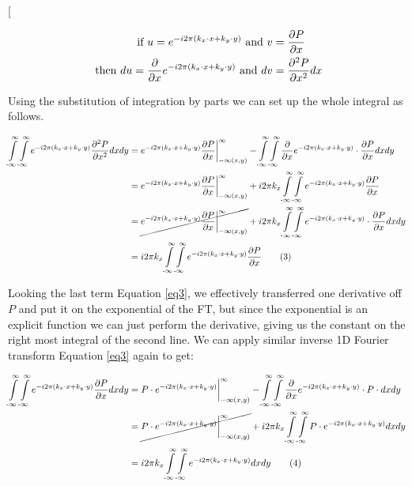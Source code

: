 \twocolumn[\begin{@twocolumnfalse}
\begin{align*} 
\textnormal{ if } u = e^{-i 2\pi (k_x \cdot x + k_y \cdot y )} \textnormal{ and } v &= \frac{\partial P}{\partial x} \\
\textnormal{ then } du= \frac{\partial}{\partial x} e^{-i 2\pi (k_x \cdot x + k_y \cdot y )} \textnormal{ and } dv &=  \frac{\partial^2 P}{\partial x^2} dx
\label{ibp2}  
\end{align*}  

Using the substitution of integration by parts we can set up the whole integral as follows.

\begin{align}  
\int\limits^{\infty}_{\text{-}\infty}\int\limits^{\infty}_{\text{-}\infty} e^{-i 2\pi (k_x \cdot x + k_y \cdot y )} \frac{\partial^2 P}{\partial x^2} dx dy &= e^{-i 2\pi (k_x \cdot x + k_y \cdot y )} \frac{\partial P}{\partial x} \bigg \vert^{\infty}_{-\infty(x,y)} - \int\limits^{\infty}_{\text{-}\infty}\int\limits^{\infty}_{\text{-}\infty} \frac{\partial }{\partial x} e^{-i 2\pi (k_x \cdot x + k_y \cdot y )} \cdot \frac{\partial P}{\partial x} dx dy\\
& = e^{-i 2\pi (k_x \cdot x + k_y \cdot y )} \frac{\partial P}{\partial x} \bigg \vert^{\infty}_{-\infty(x,y)} + i 2\pi k_x \int\limits^{\infty}_{\text{-}\infty}\int\limits^{\infty}_{\text{-}\infty} e^{-i 2\pi (k_x \cdot x + k_y \cdot y )} \frac{\partial P}{\partial x} \\
& = \cancel{e^{-i 2\pi (k_x \cdot x + k_y \cdot y )} \frac{\partial P}{\partial x} \bigg \vert^{\infty}_{-\infty(x,y)}} + i 2\pi k_x \int\limits^{\infty}_{\text{-}\infty}\int\limits^{\infty}_{\text{-}\infty} e^{-i 2\pi (k_x \cdot x + k_y \cdot y )} \cdot \frac{\partial P}{\partial x} dx dy\\
& = i 2\pi k_x \int\limits^{\infty}_{\text{-}\infty}\int\limits^{\infty}_{\text{-}\infty} e^{-i 2\pi (k_x \cdot x + k_y \cdot y )} \frac{\partial P}{\partial x} \tag{3}
\label{eq3}  
\end{align}  

Looking the last term Equation \eqref{eq3}, we effectively transferred one derivative off $P$ and put it on the exponential of the FT, but since the exponential is an explicit function we can just perform the derivative, giving us the constant on the right most integral of the second line. We can apply similar inverse 1D Fourier transform Equation \eqref{eq3} again to get:

\begin{align}  
\int\limits^{\infty}_{\text{-}\infty}\int\limits^{\infty}_{\text{-}\infty} e^{-i 2\pi (k_x \cdot x + k_y \cdot y )} \frac{\partial P}{\partial x} dx dy &= P \cdot e^{-i 2\pi (k_x \cdot x + k_y \cdot y )} \bigg \vert^{\infty}_{-\infty(x,y)} - \int\limits^{\infty}_{\text{-}\infty}\int\limits^{\infty}_{\text{-}\infty} \frac{\partial }{\partial x} e^{-i 2\pi (k_x \cdot x + k_y \cdot y )} \cdot P \cdot dx dy\\
& = \cancel{P \cdot e^{-i 2\pi (k_x \cdot x + k_y \cdot y )} \bigg \vert^{\infty}_{-\infty(x,y)}} + i 2\pi k_x \int\limits^{\infty}_{\text{-}\infty}\int\limits^{\infty}_{\text{-}\infty} P \cdot e^{-i 2\pi (k_x \cdot x + k_y \cdot y )} dx dy\\
& = i 2\pi k_x \int\limits^{\infty}_{\text{-}\infty}\int\limits^{\infty}_{\text{-}\infty} e^{-i 2\pi (k_x \cdot x + k_y \cdot y )} dx dy \tag{4}
\label{eq4}  
\end{align} 


\end{@twocolumnfalse}
